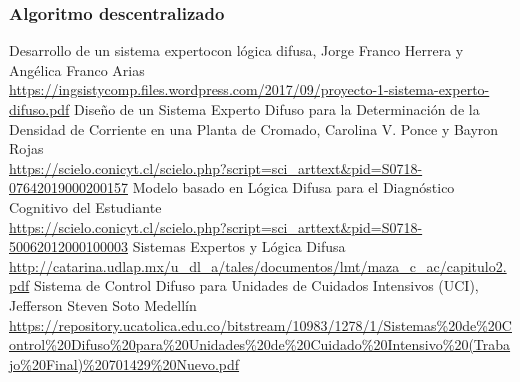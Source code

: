 \documentclass[a4paper, 11pt, titlepage]{article}
\begin{document}
        \subsubsection{Algoritmo descentralizado}

\newpage
\begin{thebibliography}{X}
    \bibitem{} Desarrollo de un sistema expertocon lógica difusa, Jorge Franco Herrera y Angélica Franco Arias \\ \url{https://ingsistycomp.files.wordpress.com/2017/09/proyecto-1-sistema-experto-difuso.pdf}
    \bibitem{} Diseño de un Sistema Experto Difuso para la Determinación de la Densidad de Corriente en una Planta de Cromado, Carolina V. Ponce y Bayron Rojas \\ \url{https://scielo.conicyt.cl/scielo.php?script=sci_arttext&pid=S0718-07642019000200157}
    \bibitem{} Modelo basado en Lógica Difusa para el Diagnóstico Cognitivo del Estudiante \\ \url{https://scielo.conicyt.cl/scielo.php?script=sci_arttext&pid=S0718-50062012000100003}
    \bibitem{} Sistemas Expertos y Lógica Difusa \\ \url{http://catarina.udlap.mx/u_dl_a/tales/documentos/lmt/maza_c_ac/capitulo2.pdf}
    \bibitem{} Sistema de Control Difuso para Unidades de Cuidados Intensivos (UCI), Jefferson Steven Soto Medellín \\ \url{https://repository.ucatolica.edu.co/bitstream/10983/1278/1/Sistemas%20de%20Control%20Difuso%20para%20Unidades%20de%20Cuidado%20Intensivo%20(Trabajo%20Final)%20701429%20Nuevo.pdf}
\end{thebibliography}
\end{document}
